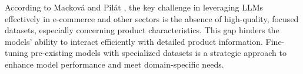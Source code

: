 According to Macková and Pilát \cite{macková2023promap}, the key challenge in leveraging LLMs effectively in e-commerce and other sectors is the absence of high-quality, focused datasets, especially concerning product characteristics. This gap hinders the models’ ability to interact efficiently with detailed product information. Fine-tuning pre-existing models with specialized datasets is a strategic approach to enhance model performance and meet domain-specific needs.